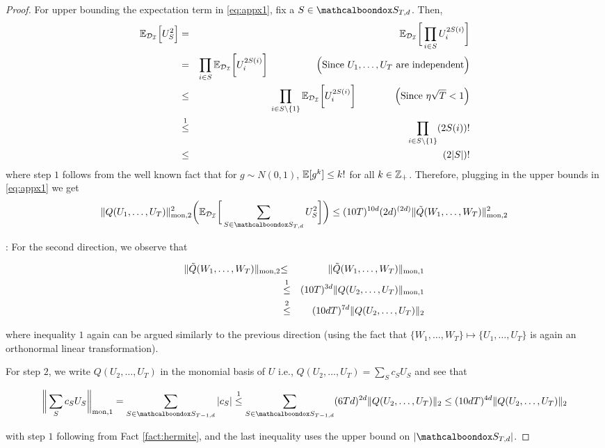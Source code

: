 \begin{proof}
	For upper bounding the expectation term in   \eqref{eq:appx1}, fix a $S \in \mcb{S}_{T,d}$. Then,
	\begin{eqnarray*}
	\mathbb{E}_{\mathcal{D}_{\mathcal{I}}} \Big[U^2_S\Big] &=&  \mathbb{E}_{\mathcal{D}_{\mathcal{I}}} \bigg[\prod_{i \in S}U^{2S(i)}_i\bigg] \\
	    &=&  \prod_{i \in S}\mathbb{E}_{\mathcal{D}_{\mathcal{I}}} \bigg[U^{2S(i)}_i\bigg]  \quad\qquad\qquad\Big(\mbox{Since } U_1,\ldots,U_T \mbox{ are independent}\Big)\\
    	&\le&  \prod_{i \in S \setminus \{1\}}\mathbb{E}_{\mathcal{D}_{\mathcal{I}}} \bigg[U^{2S(i)}_i\bigg] \qquad \qquad \Big(\mbox{Since } \eta\sqrt{T} < 1\Big) \\
	    &\overset{1}{\le}&  \prod_{i \in S \setminus \{1\}}(2S(i))! \\
	    &\le&  (2|S|)! 
	\end{eqnarray*}
	where step $1$ follows from the well known fact that for $g \sim N(0,1)$, $\mathbb{E}[g^k] \le k!$ for all $k \in {\ensuremath{\mathbb{Z}}}_+$. Therefore, plugging in the upper bounds in   \eqref{eq:appx1} we get
\begin{eqnarray*}
\|Q(U_1,\ldots,U_T)\|^2_{\rm mon,2} \bigg(\E_{\mc{D}_{\mc{I}}}\bigg[\sum_{S \in \mcb{S}_{T,d}} U^2_S\bigg]\bigg) 
\le ({10T})^{10d} (2d)^{(2d)}\|\tilde{Q}({W}_1,\ldots,W_T)\|^2_{\rm mon,2} 
\end{eqnarray*}
	
	: For the second direction, we observe that
	
	\begin{eqnarray}
	\|\tilde{Q}(W_1,\ldots,W_T)\|_{\rm mon,2} &{\le}& \|\tilde{Q}(W_1,\ldots,W_T)\|_{\rm mon,1} \\
	&\overset{1}{\le}& ({10T})^{3d} \|{Q}(U_2,\ldots,U_T)\|_{\rm mon,1} \\
    &\overset{2}{\le}& ({10dT})^{7d} \|{Q}(U_2,\ldots,U_T)\|_2			 		
	\end{eqnarray}
	
	\noindent where inequality $1$ again can be argued similarly to the previous direction (using the fact that $\{W_1,\ldots,W_T\} \mapsto \{U_1,\ldots,U_T\}$ is again an orthonormal linear transformation).  
	
	For step $2$, we write $Q(U_2,\ldots,U_T)$ in the monomial basis of $U$ i.e., $Q(U_2,\ldots,U_T) = \sum_{S} c_S U_S$ and see that 
	
	\begin{eqnarray}
	\bigg\|\sum_{S} c_S U_S\bigg\|_{\rm mon,1} = \sum_{S \in \mcb{S}_{T-1,d}}|c_S| \overset{1}{\le} \sum_{S \in \mcb{S}_{T-1,d}}({6Td})^{2d}\|Q(U_2,\ldots,U_T)\|_2 \le ({10dT})^{4d}\|Q(U_2,\ldots,U_T)\|_2
	\end{eqnarray}
	
	\noindent with step $1$ following from Fact \ref{fact:hermite}, and the last inequality uses the upper bound on $|\mcb{S}_{T,d}|$.
	
	
\end{proof}


